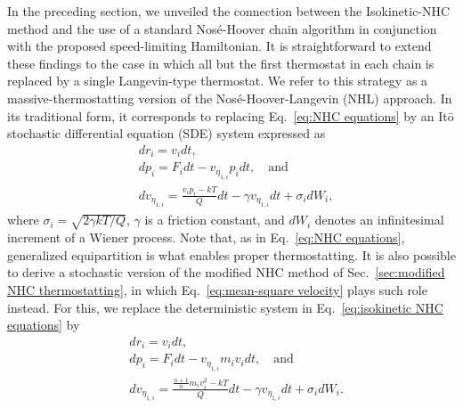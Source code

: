 \documentclass[
aip,
jcp,
reprint,
]{revtex4-1}
\newcommand{\nn}{n}
\begin{document}
In the preceding section, we unveiled the connection between the Isokinetic-NHC method \cite{Minary_2004} and the use of a standard Nos\'{e}-Hoover chain algorithm in conjunction with the proposed speed-limiting Hamiltonian.
It is straightforward to extend these findings to the case in which all but the first thermostat in each chain is replaced by a single Langevin-type thermostat.
We refer to this strategy as a massive-thermostatting version of the Nos\'{e}-Hoover-Langevin (NHL) \cite{Samoletov_2007, Leimkuhler_2009} approach.
In its traditional form, it corresponds to replacing Eq.~\eqref{eq:NHC equations} by an It\={o} stochastic differential equation (SDE) system expressed as
\begin{subequations}
	\label{eq:NHL equations}
	\begin{align}
	&dr_i = v_i dt, \\
	&dp_i = F_i dt - v_{\eta_{1,i}} p_i dt, \quad \mathrm{and} \label{eq:NHL equations p} \\
	&dv_{\eta_{1, i}} = \frac{v_i p_i - kT}{Q}dt - \gamma v_{\eta_{1, i}}dt + \sigma_i dW_i,  \label{eq:NHL equations v_eta_1}
	\end{align}
\end{subequations}
where
$\sigma_i = \sqrt{2 \gamma kT / Q}$,
$\gamma$ is a friction constant,
and $dW_i$ denotes an infinitesimal increment of a Wiener process.
Note that, as in Eq.~\eqref{eq:NHC equations}, generalized equipartition is what enables proper thermostatting.
It is also possible to derive a stochastic version of the modified NHC method of Sec.~\ref{sec:modified NHC thermostatting}, in which Eq.~\eqref{eq:mean-square velocity} plays such role instead.
For this, we replace the deterministic system in Eq.~\eqref{eq:isokinetic NHC equations} by
\begin{subequations}
	\label{eq:SIN(R) equations}
	\begin{align}
	&dr_i = v_i dt, \\
	&dp_i = F_i dt - v_{\eta_{1,i}} m_i v_i dt, \quad \mathrm{and} \label{eq:SIN(R) equations p} \\
	&dv_{\eta_{1, i}} = \frac{\frac{\nn+1}{\nn} m_i v_i^2 - kT}{Q} dt - \gamma v_{\eta_{1, i}} dt + \sigma_i dW_i.
	\end{align}
\end{subequations}
\end{document}
